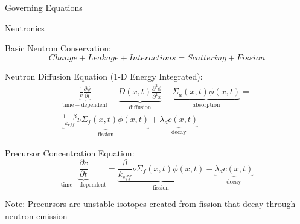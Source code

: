 \documentclass{beamer}
\begin{document}
\begin{section}{Governing Equations}
\begin{frame}{Neutronics}
\begin{customlist}{2ex}{0pt}

    \item Basic Neutron Conservation:
    \[
      \nonumber Change + Leakage + Interactions = Scattering + Fission
    \]

    \item Neutron Diffusion Equation (1-D Energy Integrated):
    \begin{multline}
    \nonumber
\underbrace{\frac{1}{v}\frac{\partial\phi}{\partial t}}_{\mathrm{time-dependent}}-\underbrace{D\left(x,t\right)\frac{\partial^{2} \phi}{\partial^{2} x}}_{\mathrm{diffusion}}+\underbrace{\Sigma_{a}\left(x,t\right)\phi\left(x,t\right)}_{\mathrm{absorption}}= \\ \underbrace{\frac{1-\beta}{k_{eff}}\nu\Sigma_{f}\left(x,t\right)\phi\left(x,t\right)}_{\mathrm{fission}} + \underbrace{\lambda_{d}c\left(x,t\right)}_{\mathrm{decay}}
    \end{multline}

    \vspace{-0.04cm}\item Precursor Concentration Equation:
    \[
    \nonumber {\underbrace{\frac{\partial c}{\partial t}}_{\mathrm{time-dependent}}=\underbrace{\frac{\beta}{k_{eff}}\nu\Sigma_{f}\left(x,t\right)\phi\left(x,t\right)}_{\mathrm{fission}}-\underbrace{\lambda_{d}c\left(x,t\right)}_{\mathrm{decay}}   }
    \]

  \scriptsize{\alert{Note:} Precursors are unstable isotopes created from fission that decay through neutron emission}


\end{customlist}
\end{frame}
\end{section}
\end{document}
